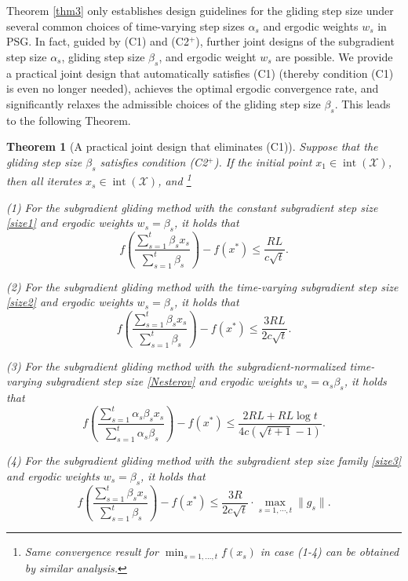 \documentclass[sn-mathphys]{JORSC-jnl}%
\theoremstyle{thmstyleone}%
\newtheorem{theorem}{Theorem}[section]%
\theoremstyle{thmstylethree}%
\begin{document}
Theorem \ref{thm3} only establishes design guidelines for the gliding step size under several common choices of time-varying step sizes $\alpha_s$ and ergodic weights $w_s$ in PSG. In fact, guided by (C1) and (C2$^+$), further joint designs of the subgradient step size $\alpha_s$, gliding step size $\beta_s$, and ergodic weight $w_s$ are possible. We provide a practical joint design that automatically satisfies (C1) (thereby condition (C1) is even no longer needed), achieves the optimal ergodic convergence rate, and significantly relaxes the admissible choices of the gliding step size $\beta_s$. This leads to the following Theorem.

\begin{theorem}[A practical joint design that eliminates (C1)]\label{cor:joint_design}
	Suppose that the gliding step size $\beta_s$ satisfies condition (C2$^+$).
	If the initial point $x_1 \in \operatorname{int}(\mathcal{X})$, then all iterates $x_s \in \operatorname{int}(\mathcal{X})$, and \footnote{Same convergence result for $\min_{s=1,\ldots,t} f(x_s)$ in case (1-4) can be obtained by similar analysis.}
	
	(1) For the subgradient gliding method with the constant subgradient step size \eqref{size1} and  ergodic weights $w_s = \beta_s$, it holds that
	\begin{equation}\label{WeakConvergence1pd}
		f\left( \frac{\sum_{s=1}^t \beta_s x_s}{\sum_{s=1}^t \beta_s} \right) - f(x^*)
		\leq \frac{RL}{c\sqrt{t}}.
	\end{equation}
	
	(2) For the subgradient gliding method with the time-varying subgradient step size \eqref{size2} and ergodic weights $w_s = \beta_s$, it holds that
	\begin{equation}\label{WeakConvergence2pd}
		f\left( \frac{\sum_{s=1}^t \beta_s x_s}{\sum_{s=1}^t \beta_s} \right) - f(x^*)
		\leq \frac{3RL}{2c\sqrt{t}}.
	\end{equation}
	
	(3) For the subgradient gliding method with the subgradient-normalized time-varying subgradient step size \eqref{Nesterov} and ergodic weights $w_s = \alpha_s \beta_s$, it holds that
	\begin{equation}\label{WeakConvergence3pd}
		f\left(\frac{\sum_{s=1}^t \alpha_s\beta_s x_s}{\sum_{s=1}^t \alpha_s\beta_s}\right)-f(x^*)\leq \frac{2RL+RL\log t}{4c(\sqrt{t+1}-1)}.
	\end{equation}
	
	(4) For the subgradient gliding method with the subgradient step size family \eqref{size3} and ergodic weights $w_s = \beta_s$, it holds that
	\begin{equation}\label{WeakConvergence4pd}
		f\left( \frac{\sum_{s=1}^t \beta_s x_s}{\sum_{s=1}^t \beta_s} \right) - f(x^*)
		\leq \frac{3R}{2c\sqrt{t}}\cdot \max_{s=1,\cdots,t}\|g_s\|.
	\end{equation}
\end{theorem}
\end{document}
